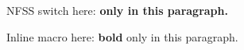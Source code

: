 NFSS switch here: \bfseries only in this paragraph.

Inline macro here: \textbf{bold} only in this paragraph.

